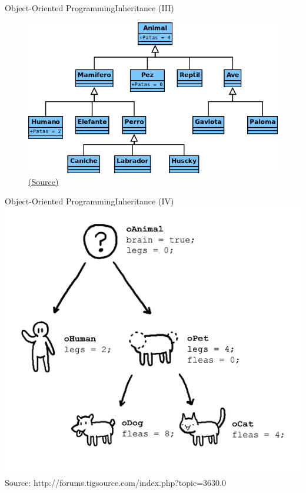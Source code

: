\documentclass[10pt,compress]{beamer} %
\begin{document}
\begin{frame}{Object-Oriented Programming}{Inheritance (III)}
	\begin{figure}
		\includegraphics[scale=0.4]{figs/herencia1}\\
		\tiny{\href{http://android.scenebeta.com}{(Source)}}
	\end{figure}
\end{frame}

\begin{frame}{Object-Oriented Programming}{Inheritance (IV)}
	\centering \includegraphics[width=0.7\linewidth]{figs/hierarchyGame}\\
	\bigskip
	\centering \tiny{Source: http://forums.tigsource.com/index.php?topic=3630.0}
\end{frame}
\end{document}
